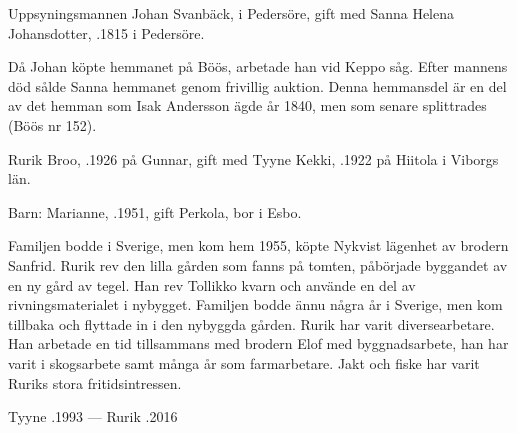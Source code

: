 Uppsyningsmannen Johan Svanbäck,  i Pedersöre, gift med Sanna Helena Johansdotter, .1815 i Pedersöre.
\begin{jhchildren}
  \item {}
  \item {}
  \item {}
  \item {}
\end{jhchildren}
Då Johan köpte hemmanet på Böös, arbetade han vid Keppo såg. Efter mannens död sålde Sanna hemmanet genom frivillig auktion. Denna hemmansdel är en del av det hemman som Isak Andersson ägde år 1840, men som senare splittrades (Böös nr 152).






Rurik Broo, .1926 på Gunnar, gift med Tyyne Kekki, .1922 på Hiitola i Viborgs län.

Barn: Marianne, .1951, gift Perkola, bor i Esbo.

Familjen bodde i Sverige, men kom hem 1955, köpte Nykvist lägenhet av brodern Sanfrid. Rurik rev den lilla gården som fanns på tomten, påbörjade byggandet av en ny gård av tegel. Han rev Tollikko kvarn och använde en del av rivningsmaterialet i nybygget. Familjen bodde 		 ännu några år i Sverige, men kom tillbaka och flyttade in i den nybyggda gården. Rurik har varit diversearbetare. Han arbetade en tid tillsammans med brodern Elof med byggnadsarbete, han har varit i skogsarbete samt många år som farmarbetare. Jakt och fiske har varit Ruriks stora fritidsintressen.

Tyyne .1993  ---  Rurik .2016





